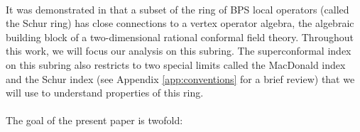 \documentclass[a4paper,10pt]{article}
\newcommand{\tsf}[1]{\textsf{#1}}
\begin{document}
\paragraph{}
It was demonstrated in \cite{Beem:2013sza} that a subset of the ring of \tsf{BPS} local operators (called the Schur ring) has close connections to a vertex operator algebra, the algebraic building block of a two-dimensional rational conformal field theory. Throughout this work, we will focus our analysis on this subring. The superconformal index on this subring also restricts to two special limits called the MacDonald index and the Schur index \cite{Gadde:2011uv, Buican:2015tda, Cordova:2015nma} (see Appendix \ref{app:conventions} for a brief review) that we will use to understand properties of this ring. 
\paragraph{}
The goal of the present paper is twofold:
\end{document}
